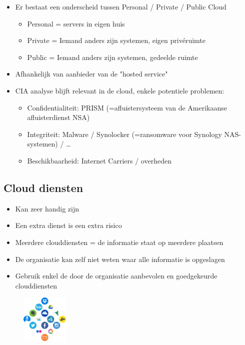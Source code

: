 \documentclass{article}
\begin{document}
\begin{itemize}
    \item Er bestaat een onderscheid tussen Personal / Private / Public Cloud
    \begin{itemize}
        \item Personal = servers in eigen huis
        \item Private = Iemand anders zijn systemen, eigen privéruimte
        \item Public = Iemand anders zijn systemen, gedeelde ruimte
    \end{itemize}
    \item Afhankelijk van aanbieder van de "hosted service"
    \item CIA analyse blijft relevant in de cloud, enkele potentiele problemen: 
    \begin{itemize}
        \item Confidentialiteit: PRISM (=afluistersysteem van de Amerikaanse afluisterdienst NSA)
        \item Integriteit: Malware / Synolocker (=ransomware voor Synology NAS-systemen) / \dots
        \item Beschikbaarheid: Internet Carriers / overheden
    \end{itemize}
\end{itemize}

\subsection{Cloud diensten}

\begin{itemize}
    \item Kan zeer handig zijn
    \item Een extra dienst is een extra risico
    \item Meerdere clouddiensten = de informatie staat op meerdere plaatsen
    \item De organisatie kan zelf niet weten waar alle informatie is opgeslagen
    \item Gebruik enkel de door de organisatie aanbevolen en goedgekeurde clouddiensten
\end{itemize}

\begin{figure}[H]
    \centering
    \includegraphics[width=0.2\textwidth]{cloud-diensten.png}
    \caption{}
\end{figure}
\end{document}
